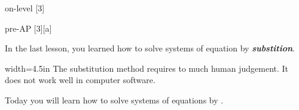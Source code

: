 



\renewcommand{\thechapter}{4} 
\renewcommand{\myCurrentChapterTitle}{Systems of Equations}

\begin{taggedblock}{on-level}
    [3]
\end{taggedblock}
\begin{taggedblock}{pre-AP}
    [3][a]
\end{taggedblock}

\begin{myObjectives}
\end{myObjectives}

\begin{myVocabulary}
\end{myVocabulary}

In the last lesson,
you learned how to solve systems of equation by {\bfseries\itshape substition}.

\begin{myCenteredBox}{width=4.5in}
    The substitution method requires to much human judgement.
    It does not work well in computer software.
\end{myCenteredBox}

\noindent
Today you will learn how to solve systems of equations by .



